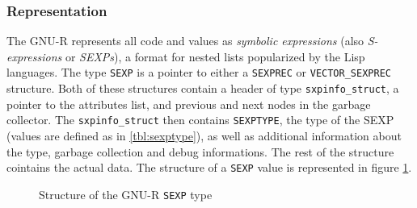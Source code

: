 \subsubsection*{Representation}

The GNU-R represents all code and values as \textit{symbolic expressions} (also \textit{S-expressions} or \textit{SEXPs}), a format for nested lists popularized by the Lisp languages. The type \texttt{SEXP} is a pointer to either a \texttt{SEXPREC} or \texttt{VECTOR\_SEXPREC} structure. Both of these structures contain a header of type \texttt{sxpinfo\_struct}, a pointer to the attributes list, and previous and next nodes in the garbage collector. The \texttt{sxpinfo\_struct} then contains \texttt{SEXPTYPE}, the type of the SEXP (values are defined as in \ref{tbl:sexptype}), as well as additional information about the type, garbage collection and debug informations. The rest of the structure cointains the actual data. The structure of a \texttt{SEXP} value is represented in figure \ref{fig:sexp-struct}.

\begin{figure}
	\centering
	\begin{adjustbox}{trim=5pt 20pt 0 40pt, clip}
	\end{adjustbox}
	\caption{Structure of the GNU-R \texttt{SEXP} type}\label{fig:sexp-struct}
\end{figure}

